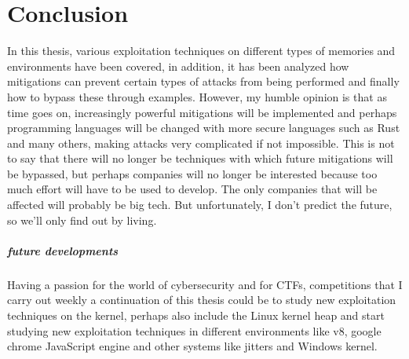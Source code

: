 \chapter{Conclusion}
    In this thesis, various exploitation techniques on different types of memories and environments have been covered, in addition, it has been analyzed how mitigations can prevent certain types of attacks from being performed and finally how to bypass these through examples.\newline
    However, my humble opinion is that as time goes on, increasingly powerful mitigations will be implemented and perhaps programming languages will be changed with more secure languages such as Rust and many others, making attacks very complicated if not impossible.\newline
    This is not to say that there will no longer be techniques with which future mitigations will be bypassed, but perhaps companies will no longer be interested because too much effort will have to be used to develop.\newline
    The only companies that will be affected will probably be big tech.\newline
    But unfortunately, I don't predict the future, so we'll only find out by living.\newline
    \paragraph{future developments}
    Having a passion for the world of cybersecurity and for CTFs, competitions that I carry out weekly a continuation of this thesis could be to study new exploitation techniques on the kernel, perhaps also include the Linux kernel heap and start studying new exploitation techniques in different environments like v8, google chrome JavaScript engine and other systems like jitters and Windows kernel.
